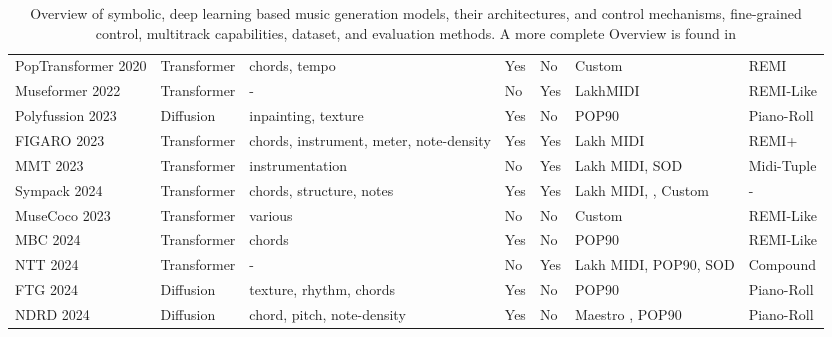 \begin{table}[H]
\begin{tabular}{|p{2.5cm}|p{1.8cm}|p{3cm}|p{1cm}|p{1cm}|p{3cm}|p{2.5cm}|}
        PopTransformer 2020 \cite{Huang_Yang_remi_pop_transformer_2020} & Transformer & chords, tempo & Yes & No & Custom & REMI\\
        Museformer 2022 \cite{Yu_Lu_Wang_Hu_Tan_Ye_Zhang_museformer_2022} & Transformer & - & No & Yes & LakhMIDI \cite{Raffel_2016} & REMI-Like\\
        Polyfussion 2023 \cite{Min_Jiang_Xia_Zhao_polyffusion_2023} & Diffusion & inpainting, texture & Yes & No & POP90 \cite{Wang_Chen_pop90_dataset} & Piano-Roll\\
        FIGARO 2023 \cite{Rütte_figaro_2023} & Transformer & chords, instrument, meter, note-density & Yes & Yes & Lakh MIDI\cite{Raffel_2016} & REMI+ \\
        MMT 2023 \cite{Dong_Chen_MMT_Kirkpatrick_2023} & Transformer & instrumentation & No & Yes & Lakh MIDI\cite{Raffel_2016}, SOD \cite{Crestel_OrchestralDataset} & Midi-Tuple \\
        Sympack 2024 \cite{Chen_Smith_Spijkervet_Wang_Zou_Li_Kong_Du_2024} & Transformer & chords, structure, notes & Yes & Yes & Lakh MIDI\cite{Raffel_2016}, \cite{Bertin-Mahieux_Ellis_Whitman_Lamere_2011}, Custom & -\\
        MuseCoco 2023 \cite{Lu_Xu_Kang_Yu_Xing_Tan_Bian_MuseCoco_2023} & Transformer & various & No & No & Custom & REMI-Like\\
        MBC 2024 \cite{Shu_Xu_Musebarcontrol_2024} & Transformer & chords & Yes & No & POP90\cite{Wang_Chen_pop90_dataset} & REMI-Like\\
        NTT 2024\cite{Ryu_Dong_nested_2024} & Transformer & - & No  & Yes & Lakh MIDI\cite{Raffel_2016}, POP90\cite{Wang_Chen_pop90_dataset}, SOD\cite{Crestel_OrchestralDataset} & Compound\\
        FTG 2024\cite{Zhu_Liu_Jiang_Zheng_texture_2024} & Diffusion & texture, rhythm, chords & Yes & No & POP90 \cite{Wang_Chen_pop90_dataset} & Piano-Roll \\
        NDRD 2024\cite{Huang_rule_diffusion_2024} & Diffusion & chord, pitch, note-density & Yes & No & Maestro \cite{hawthorne2018maestro}, POP90\cite{Wang_Chen_pop90_dataset} & Piano-Roll \\
        \hline
    \end{tabular}
    \caption{Overview of symbolic, deep learning based music generation models, their architectures, and control mechanisms, fine-grained control, multitrack capabilities, dataset, and evaluation methods. A more complete Overview
    is found in \cite{Ji_Yang_Luo_survey_symbolic_2024}}
    \label{tab:music_models}
\end{table}


